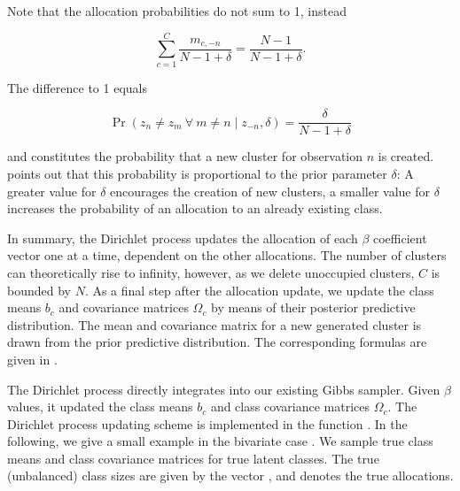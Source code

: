 \documentclass[article]{jss}
\newcommand{\fct}[1]{\code{#1()}}
\begin{document}
Note that the allocation probabilities do not sum to 1, instead

$$ \sum_{c = 1}^C \frac{m_{c,-n}}{N-1+\delta} = \frac{N-1}{N-1+\delta}. $$

The difference to 1 equals

$$ \Pr(z_n \neq z_m ~ \forall ~ m \neq n \mid z_{-n}, \delta) = \frac{\delta}{N-1+\delta} $$

and constitutes the probability that a new cluster for observation $n$ is created. \cite{Neal:2000} points out that this probability is proportional to the prior parameter $\delta$: A greater value for $\delta$ encourages the creation of new clusters, a smaller value for $\delta$ increases the probability of an allocation to an already existing class.

In summary, the Dirichlet process updates the allocation of each $\beta$ coefficient vector one at a time, dependent on the other allocations. The number of clusters can theoretically rise to infinity, however, as we delete unoccupied clusters, $C$ is bounded by $N$. As a final step after the allocation update, we update the class means $b_c$ and covariance matrices $\Omega_c$ by means of their posterior predictive distribution. The mean and covariance matrix for a new generated cluster is drawn from the prior predictive distribution. The corresponding formulas are given in \cite{Li:2019}.

The Dirichlet process directly integrates into our existing Gibbs sampler. Given $\beta$ values, it updated the class means $b_c$ and class covariance matrices $\Omega_c$. The Dirichlet process updating scheme is implemented in the function \fct{update\_classes\_dp}. In the following, we give a small example in the bivariate case . We sample true class means  and class covariance matrices  for  true latent classes. The true (unbalanced) class sizes are given by the vector , and  denotes the true allocations.
\end{document}
